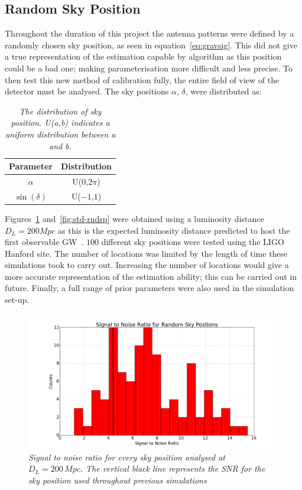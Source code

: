 \documentclass{jpconf}
\begin{document}
\subsection{Random Sky Position}
\label{sec:rndsp}
Throughout the duration of this project the antenna patterns were defined by a randomly chosen sky position, as seen in equation~\ref{eq:gravsig}. This did not give a true representation of the estimation capable by algorithm as this position could be a bad one; making parameterisation more difficult and less precise. To then test this new method of calibration fully, the entire field of view of the detector must be analysed. The sky positions $\alpha$, $\delta$, were distributed as:
\begin{table}[H]
\centering
  \begin{tabular}{|c|c|}
    \hline
    Parameter & Distribution \\
    \hline
    $\alpha$       & U($0$,$2\pi$) \\
    $\sin(\delta)$ & U($-1$,$1$)    \\
    \hline
  \end{tabular}
  \caption{\textit{The distribution of sky position. U(a,b) indicates a uniform distribution between a and b.}}
  \label{tab:sp}
\end{table}




Figures~\ref{fig:snr-rndsp} and~\ref{fig:std-rndsp} were obtained using a luminosity distance $D_{L} = 200 Mpc$ as this is the expected luminosity distance predicted to host the first observable GW~\cite{peadvanced}. $100$ different sky positions were tested using the LIGO Hanford site. The number of locations was limited by the length of time these simulations took to carry out. Increasing the number of locations would give a more accurate representation of the estimation ability; this can be carried out in future. Finally, a full range of prior parameters were also used in the simulation set-up. 



\begin{figure}[h]
  \centering
  \includegraphics[width=\textwidth]{rand_sp_snr_D200}
  \caption{\textit{Signal to noise ratio for every sky position analysed at $D_{L} = 200 \,Mpc$. The vertical black line represents the SNR for the sky position used throughout previous simulations}}
  \label{fig:snr-rndsp}
\end{figure}
\end{document}
